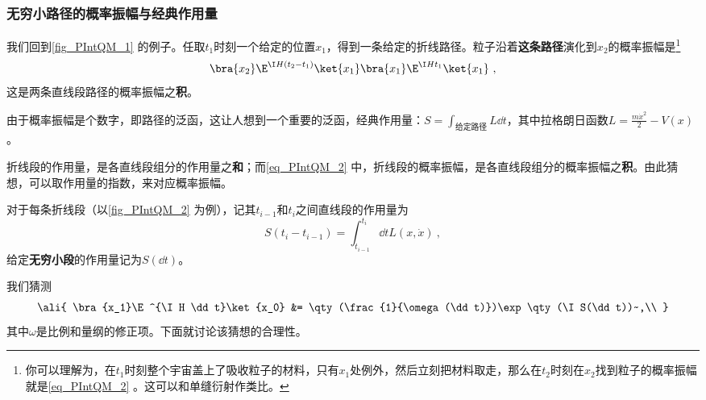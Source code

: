 \subsubsection{无穷小路径的概率振幅与经典作用量}

我们回到\autoref{fig_PIntQM_1} 的例子。任取$t_1$时刻一个给定的位置$x_1$，得到一条给定的折线路径。粒子沿着\textbf{这条路径}演化到$x_2$的概率振幅是\footnote{你可以理解为，在$t_1$时刻整个宇宙盖上了吸收粒子的材料，只有$x_1$处例外，然后立刻把材料取走，那么在$t_2$时刻在$x_2$找到粒子的概率振幅就是\autoref{eq_PIntQM_2} 。这可以和单缝衍射作类比。}
\begin{equation}\label{eq_PIntQM_2}
\bra{x_2}\E^{\I H (t_2-t_1)}\ket{x_1}\bra{x_1}\E^{\I H t_1}\ket{x_1}~,
\end{equation}
这是两条直线段路径的概率振幅之\textbf{积}。



由于概率振幅是个数字，即路径的泛函，这让人想到一个重要的泛函，经典作用量：$S=\int_{\text{给定路径}}L\dd t$，其中拉格朗日函数$L=\frac{m\dot{x}^2}{2}-V(x)$。

折线段的作用量，是各直线段组分的作用量之\textbf{和}；而\autoref{eq_PIntQM_2} 中，折线段的概率振幅，是各直线段组分的概率振幅之\textbf{积}。由此猜想，可以取作用量的指数，来对应概率振幅。

对于每条折线段（以\autoref{fig_PIntQM_2} 为例），记其$t_{i-1}$和$t_i$之间直线段的作用量为
\begin{equation}
S(t_{i}-t_{i-1})=\int^{t_i}_{t_{i-1}}\dd t L(x, \dot{x})~,
\end{equation}
给定\textbf{无穷小段}的作用量记为$S(\dd t)$。

我们猜测
\begin{equation}
\ali{
    \bra{x_1}\E^{\I H \dd t}\ket{x_0} &= \qty(\frac{1}{\omega(\dd t)})\exp\qty(\I S(\dd t))~,\\
}
\end{equation}
其中$\omega$是比例和量纲的修正项。下面就讨论该猜想的合理性。

